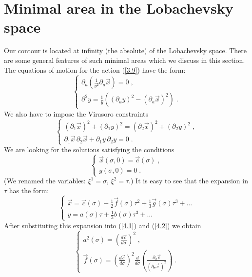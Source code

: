 \documentclass[a4paper,12pt]{article}
\numberwithin{equation}{section}
\newcommand{\dis}{\displaystyle}
\begin{document}
\section{Minimal area in the Lobachevsky space}

Our contour is located at infinity (the absolute) of the Lobachevsky space.
There are some general features of such minimal areas which we discuss in this
section. The equations of motion for the action (\ref{3.9}) have the form:
\begin{equation}
\label{4.1}
\left\{ \begin{array}{l}
\dis \partial _{a}\left( \frac{1}{y^{2}}\partial _{a}\vec{x}\right) =0\; ,\\
\dis \partial ^{2}y=\frac{1}{y}\left( (\partial _{a}y)^{2}-\left( \partial _{a}\vec{x}\right) ^{2}\right) \; .
\end{array}\right. 
\end{equation}
 We also have to impose the Virasoro constraints
\begin{equation}
\label{4.2}
\left\{ \begin{array}{l}
\dis \left( \partial _{1}\vec{x}\right) ^{2}+\left( \partial _{1}y\right) ^{2}=\left( \partial _{2}\vec{x}\right) ^{2}+\left( \partial _{2}y\right) ^{2}\; ,\\
\dis \partial _{1}\vec{x}\, \partial _{2}\vec{x}+\partial _{1}y\, \partial _{2}y=0\; .
\end{array}\right. 
\end{equation}
 We are looking for the solutions satisfying the conditions
\[
\left\{ \begin{array}{l}
\vec{x}(\sigma ,0)=\vec{c}(\sigma )\; ,\\
y(\sigma ,0)=0\; .
\end{array}\right. \]
 (We renamed the variables: \( \xi ^{1}=\sigma  \), \( \xi ^{2}=\tau  \).)
It is easy to see that the expansion in \( \tau  \) has the form:
\begin{equation}
\label{4.4}
\left\{ \begin{array}{l}
\dis \vec{x}=\vec{c}(\sigma )+\frac{1}{2}\vec{f}(\sigma )\tau ^{2}+\frac{1}{3}\vec{g}(\sigma )\tau ^{3}+\ldots \\
\dis y=a(\sigma )\tau +\frac{1}{3}b(\sigma )\tau ^{3}+\ldots 
\end{array}\right. 
\end{equation}
 After substituting this expansion into (\ref{4.1}) and (\ref{4.2}) we obtain
\begin{equation}
\label{4.5}
\left\{ \begin{array}{l}
\dis a^{2}(\sigma )=\left( \frac{d\vec{c}}{d\sigma }\right) ^{2}\; ,\\
\dis \vec{f}(\sigma )=\left( \frac{d\vec{c}}{d\sigma }\right) ^{2}\frac{d}{d\sigma }\left( \frac{\partial _{\sigma }\vec{c}}{\left( \partial _{\sigma }\vec{c}\, \right) ^{2}}\right) \; .
\end{array}\right. 
\end{equation}
\end{document}
